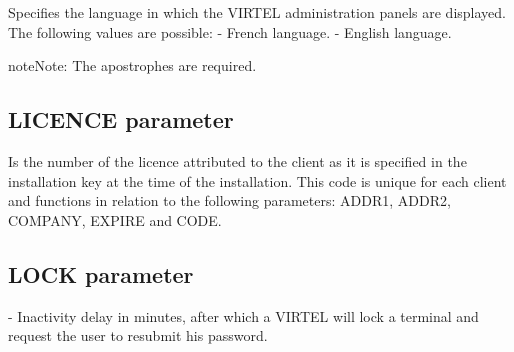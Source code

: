 \documentclass[letterpaper,10pt,english]{sphinxmanual}
\begin{document}
Specifies the language in which the VIRTEL administration panels are displayed. The following values are possible:
 - French language.
 - English language.

\begin{sphinxadmonition}{note}{Note:}
The apostrophes are required.
\end{sphinxadmonition}

\ignorespaces 

\subsection{LICENCE parameter}
\label{\detokenize{Installation_Guide:licence-parameter}}\label{\detokenize{Installation_Guide:index-85}}
\begin{sphinxVerbatim}[commandchars=\\\{\}]
                          
\end{sphinxVerbatim}

Is the number of the licence attributed to the client as it is specified in the installation key at the time of the installation. This code is unique for each client and functions in relation to the following parameters: ADDR1, ADDR2, COMPANY, EXPIRE and CODE.

\ignorespaces 

\subsection{LOCK parameter}
\label{\detokenize{Installation_Guide:lock-parameter}}\label{\detokenize{Installation_Guide:index-86}}
\begin{sphinxVerbatim}[commandchars=\\\{\}]
                               
\end{sphinxVerbatim}

 - Inactivity delay in minutes, after which a VIRTEL will lock a terminal and request the user to resubmit his password.
\end{document}
